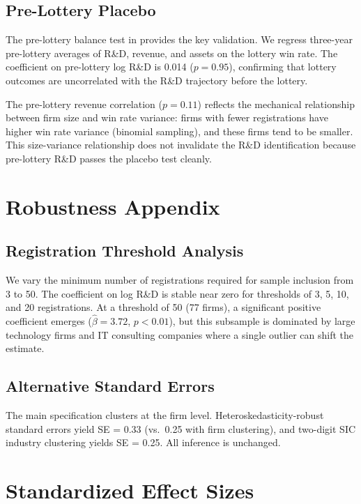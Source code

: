 \documentclass[12pt]{article}
\begin{document}
\subsection{Pre-Lottery Placebo}

The pre-lottery balance test in  provides the key validation. We regress three-year pre-lottery averages of R\&D, revenue, and assets on the lottery win rate. The coefficient on pre-lottery log R\&D is 0.014 ($p = 0.95$), confirming that lottery outcomes are uncorrelated with the R\&D trajectory before the lottery.

The pre-lottery revenue correlation ($p = 0.11$) reflects the mechanical relationship between firm size and win rate variance: firms with fewer registrations have higher win rate variance (binomial sampling), and these firms tend to be smaller. This size-variance relationship does not invalidate the R\&D identification because pre-lottery R\&D passes the placebo test cleanly.

\section{Robustness Appendix}

\subsection{Registration Threshold Analysis}

We vary the minimum number of registrations required for sample inclusion from 3 to 50. The coefficient on log R\&D is stable near zero for thresholds of 3, 5, 10, and 20 registrations. At a threshold of 50 (77 firms), a significant positive coefficient emerges ($\hat{\beta} = 3.72$, $p < 0.01$), but this subsample is dominated by large technology firms and IT consulting companies where a single outlier can shift the estimate.

\subsection{Alternative Standard Errors}

The main specification clusters at the firm level. Heteroskedasticity-robust standard errors yield SE = 0.33 (vs.\ 0.25 with firm clustering), and two-digit SIC industry clustering yields SE = 0.25. All inference is unchanged.

\section{Standardized Effect Sizes}
\label{sec:sde}


\end{document}
